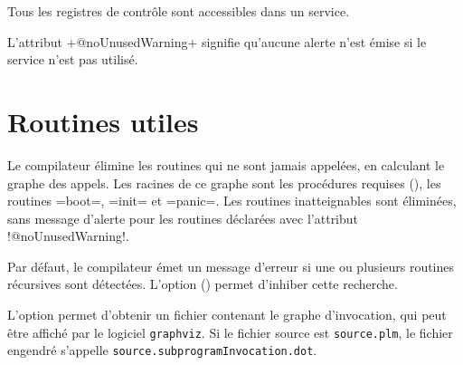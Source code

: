 
Tous les registres de contrôle sont accessibles dans un service.








L'attribut \plm+@noUnusedWarning+ signifie qu'aucune alerte n'est émise si le service n'est pas utilisé.



































\section{Routines utiles}

Le compilateur élimine les routines qui ne sont jamais appelées, en calculant le graphe des appels. Les racines de ce graphe sont les procédures requises (), les routines \plm=boot=, \plm=init= et \plm=panic=. Les routines inatteignables sont éliminées, sans message d'alerte pour les routines déclarées avec l'attribut \plm!@noUnusedWarning!.












Par défaut, le compilateur émet un message d'erreur si une ou plusieurs routines récursives sont détectées. L'option  () permet d'inhiber cette recherche.

L'option  permet d'obtenir un fichier contenant le graphe d'invocation, qui peut être affiché par le logiciel \texttt{graphviz}. Si le fichier source est \texttt{source.plm}, le fichier engendré s'appelle \texttt{source.subprogramInvocation.dot}.

